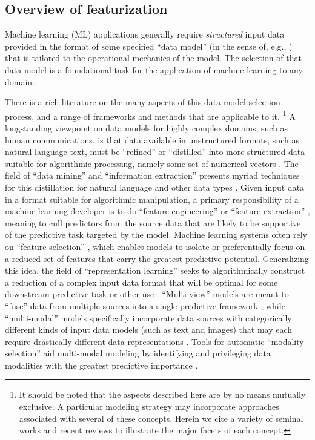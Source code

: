 \documentclass[nonacm,12pt]{acmart}
\begin{document}
\subsection{Overview of featurization}

Machine learning (ML) applications generally require \emph{structured} input data provided in the format of some specified ``data model'' (in the sense of, e.g., \citealt{rowe_postgres_1987}) that is tailored to the operational mechanics of the model.  The selection of that data model is a foundational task for the application of machine learning to any domain.

There is a rich literature on the many aspects of this data model selection process, and a range of frameworks and methods that are applicable to it.
\footnote{It should be noted that the aspects described here are by no means mutually exclusive.  
A particular modeling strategy may incorporate approaches associated with several of these concepts.  Herein we cite a variety of seminal works and recent reviews to illustrate the major facets of each concept.}  
A longstanding viewpoint on data models for highly complex domains, such as human communications, is that data available in unstructured formats, such as natural language text, must be ``refined'' or ``distilled'' into more structured data suitable for algorithmic processing, namely some set of numerical vectors \cite{mccallum_information_2005}.  
The field of ``data mining'' and ``information extraction'' presents myriad techniques for this distillation for natural language and other data types \cite{balducci_unstructured_2018}.  Given input data in a format suitable for algorithmic manipulation, a primary responsibility of a machine learning developer is to do ``feature engineering'' or ``feature extraction'' \cite{khalid_survey_2014}, meaning to cull predictors from the source data that are likely to be supportive of the predictive task targeted by the model.  
Machine learning systems often rely on ``feature selection'' \citep{kira_practical_1992}, which enables models to isolate or preferentially focus on a reduced set of features that carry the greatest predictive potential.  
Generalizing this idea, the field of ``representation learning'' seeks to algorithmically construct a reduction of a complex input data format that will be optimal for some downstream predictive task or other use \cite{bengio_representation_2013}.  
``Multi-view'' models are meant to ``fuse'' data from multiple sources into a single predictive framework \cite{li_review_2016}, while ``multi-modal'' models specifically incorporate data sources with categorically different kinds of input data models (such as text and images) that may each require drastically different data representations \cite{ngiam_multimodal_2011}.  
Tools for automatic ``modality selection'' aid multi-modal modeling by identifying and privileging data modalities with the greatest predictive importance \cite{xiao_collaborative_2019}. 
\end{document}
